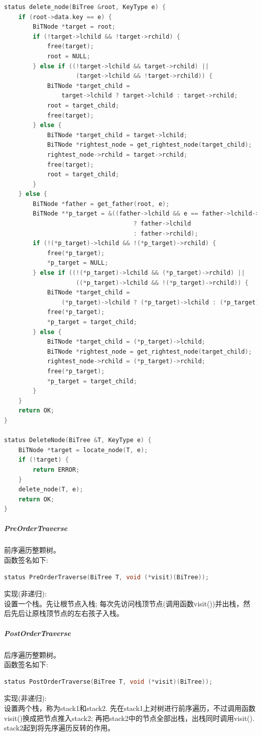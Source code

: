 \documentclass[supercite]{Experimental_Report}
\theoremstyle{definition}
\begin{document}
\begin{lstlisting}[language=C++, frame=single]
status delete_node(BiTree &root, KeyType e) {
	if (root->data.key == e) {
		BiTNode *target = root;
		if (!target->lchild && !target->rchild) {
			free(target);
			root = NULL;
		} else if ((!target->lchild && target->rchild) ||
					(target->lchild && !target->rchild)) {
			BiTNode *target_child =
				target->lchild ? target->lchild : target->rchild;
			root = target_child;
			free(target);
		} else {
			BiTNode *target_child = target->lchild;
			BiTNode *rightest_node = get_rightest_node(target_child);
			rightest_node->rchild = target->rchild;
			free(target);
			root = target_child;
		}
	} else {
		BiTNode *father = get_father(root, e);
		BiTNode **p_target = &((father->lchild && e == father->lchild->data.key)
									? father->lchild
									: father->rchild);
		if (!(*p_target)->lchild && !(*p_target)->rchild) {
			free(*p_target);
			*p_target = NULL;
		} else if ((!(*p_target)->lchild && (*p_target)->rchild) ||
					((*p_target)->lchild && !(*p_target)->rchild)) {
			BiTNode *target_child =
				(*p_target)->lchild ? (*p_target)->lchild : (*p_target)->rchild;
			free(*p_target);
			*p_target = target_child;
		} else {
			BiTNode *target_child = (*p_target)->lchild;
			BiTNode *rightest_node = get_rightest_node(target_child);
			rightest_node->rchild = (*p_target)->rchild;
			free(*p_target);
			*p_target = target_child;
		}
	}
	return OK;
}

status DeleteNode(BiTree &T, KeyType e) {
    BiTNode *target = locate_node(T, e);
    if (!target) {
        return ERROR;
    }
    delete_node(T, e);
    return OK;
}
\end{lstlisting}

\subparagraph{PreOrderTraverse}
\noindent
前序遍历整颗树。 \\
函数签名如下:
\begin{lstlisting}[language=C++, frame=single]
status PreOrderTraverse(BiTree T, void (*visit)(BiTree));
\end{lstlisting}
实现(非递归): \\
设置一个栈。先让根节点入栈; 每次先访问栈顶节点(调用函数visit())并出栈，然后先后让原栈顶节点的左右孩子入栈。 \\

\subparagraph{PostOrderTraverse}
\noindent
后序遍历整颗树。 \\
函数签名如下:
\begin{lstlisting}[language=C++, frame=single]
status PostOrderTraverse(BiTree T, void (*visit)(BiTree));
\end{lstlisting}
实现(非递归): \\
设置两个栈，称为stack1和stack2. 先在stack1上对树进行前序遍历，不过调用函数visit()换成把节点推入stack2; 再把stack2中的节点全部出栈，出栈同时调用visit(). stack2起到将先序遍历反转的作用。\\
\end{document}
